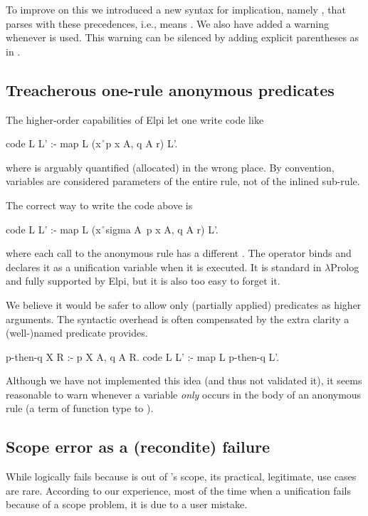 \documentclass{these-ISSS}
\newenvironment{elpicode}
  {\VerbatimEnvironment\begin{elpibox}\begin{xelpicode}}{\end{xelpicode}
\end{elpibox}}
\begin{document}
To improve on this we introduced a new syntax for implication, namely \elpi{==>},
that parses with these precedences, i.e.,
 means .
We also have added a
warning whenever  is used. This warning can be silenced by
adding explicit parentheses as in .

\subsection{Treacherous one-rule anonymous predicates}

The higher-order capabilities of Elpi let one write code like
\begin{elpicode}
code L L' :- map L (x\r\ p x A, q A r) L'.
\end{elpicode}
where  is arguably quantified (allocated) in the wrong place. By
convention, variables are considered parameters of the entire rule, not of the
inlined sub-rule.

The correct way to write the code above is
\begin{elpicode}
code L L' :- map L (x\r\ sigma A\ p x A, q A r) L'.
\end{elpicode}
\noindent
where each call to the anonymous rule has a different .
The  operator binds  and declares it as
a unification variable when it is executed. It is standard in
$\lambda$Prolog and fully supported by Elpi, but it is also
too easy to forget it.

We believe it would
be safer to allow only (partially applied) predicates as
higher arguments. The syntactic overhead is often compensated by the extra
clarity a (well-)named predicate provides.

\begin{elpicode}
p-then-q X R :- p X A, q A R.
code L L' :- map L p-then-q L'.
\end{elpicode}
Although we have not implemented this idea (and thus not validated it), it
seems reasonable to warn whenever a variable \emph{only} occurs in the body of
an anonymous rule (a term of function type to ).

\subsection{Scope error as a (recondite) failure}

While  logically fails because  is out of 's
scope, its
practical, legitimate, use cases are rare. According to our experience, most
of the time when a unification fails because of a scope problem, it is due to
a user mistake.
\end{document}
